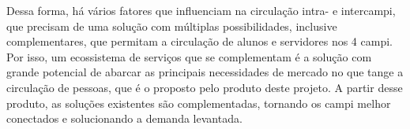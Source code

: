Dessa forma, há vários fatores que influenciam na circulação intra- e intercampi, que precisam de uma solução com múltiplas possibilidades, inclusive complementares, que permitam a circulação de alunos e servidores nos 4 campi. Por isso, um ecossistema de serviços que se complementam é a solução com grande potencial de abarcar as principais necessidades de mercado no que tange a circulação de pessoas, que é o proposto pelo produto deste projeto. A partir desse produto, as soluções existentes são complementadas, tornando os campi melhor conectados e solucionando a demanda levantada.
